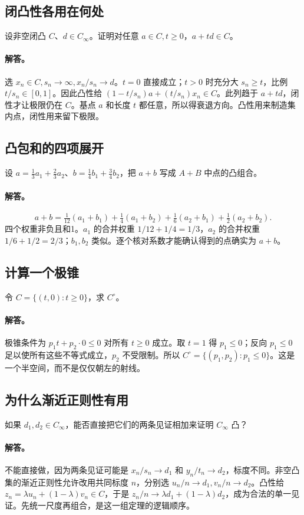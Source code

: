 \subsection{闭凸性各用在何处}
设非空闭凸 $C$、$d\in C_\infty$。证明对任意 $a\in C,t\ge0$，$a+td\in C$。
\paragraph{解答。}选 $x_n\in C,s_n\to\infty,x_n/s_n\to d$。$t=0$ 直接成立；$t>0$ 时充分大 $s_n\ge t$，比例 $t/s_n\in[0,1]$。因此凸性给 $(1-t/s_n)a+(t/s_n)x_n\in C$。此列趋于 $a+td$，闭性才让极限仍在 $C$。基点 $a$ 和长度 $t$ 都任意，所以得衰退方向。凸性用来制造集内点，闭性用来留下极限。
\subsection{凸包和的四项展开}
设 $a=\tfrac13a_1+\tfrac23a_2$、$b=\tfrac14b_1+\tfrac34b_2$，把 $a+b$ 写成 $A+B$ 中点的凸组合。
\paragraph{解答。}
\[a+b=\tfrac1{12}(a_1+b_1)+\tfrac14(a_1+b_2)
+\tfrac16(a_2+b_1)+\tfrac12(a_2+b_2).
\]
四个权重非负且和1。$a_1$ 的合并权重 $1/12+1/4=1/3$，$a_2$ 的合并权重 $1/6+1/2=2/3$；$b_1,b_2$ 类似。逐个核对系数才能确认得到的点确实为 $a+b$。
\subsection{计算一个极锥}
令 $C=\{(t,0):t\ge0\}$，求 $C^\circ$。
\paragraph{解答。}极锥条件为 $p_1t+p_2\cdot0\le0$ 对所有 $t\ge0$ 成立。取 $t=1$ 得 $p_1\le0$；反向 $p_1\le0$ 足以使所有这些不等式成立，$p_2$ 不受限制。所以 $C^\circ=\{(p_1,p_2):p_1\le0\}$。这是一个半空间，而不是仅仅朝左的射线。
\subsection{为什么渐近正则性有用}
如果 $d_1,d_2\in C_\infty$，能否直接把它们的两条见证相加来证明 $C_\infty$ 凸？
\paragraph{解答。}不能直接做，因为两条见证可能是 $x_n/s_n\to d_1$ 和 $y_n/t_n\to d_2$，标度不同。非空凸集的渐近正则性允许改用共同标度 $n$，分别选 $u_n/n\to d_1,v_n/n\to d_2$。凸性给 $z_n=\lambda u_n+(1-\lambda)v_n\in C$，于是 $z_n/n\to\lambda d_1+(1-\lambda)d_2$，成为合法的单一见证。先统一尺度再组合，是这一组定理的逻辑顺序。
